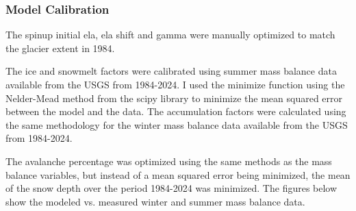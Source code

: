 \documentclass{article}
\begin{document}
\subsubsection{Model Calibration}
The spinup initial ela, ela shift and gamma were manually optimized to match the glacier extent in 1984. 

The ice and snowmelt factors were calibrated using summer mass balance data available from the USGS from 1984-2024. I used the minimize 
function using the Nelder-Mead method from the scipy library to minimize the mean squared error between the model and the data. The 
accumulation factors were calculated using the same methodology for the winter mass balance data available from the USGS from 1984-2024.

The avalanche percentage was optimized using the same methods as the mass balance variables, but instead of a mean squared error being 
minimized, the mean of the snow depth over the period 1984-2024 was minimized.
The figures below show the modeled vs. measured winter and summer mass balance data.
\end{document}

